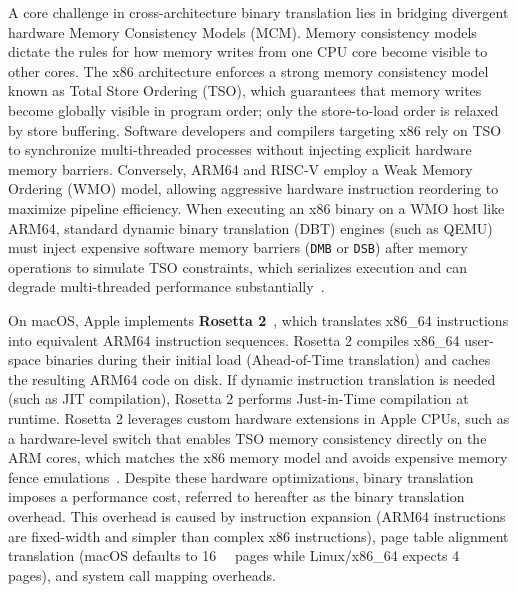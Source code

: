 A core challenge in cross-architecture binary translation lies in bridging divergent hardware Memory Consistency Models (MCM). Memory consistency models dictate the rules for how memory writes from one CPU core become visible to other cores. The x86 architecture enforces a strong memory consistency model known as Total Store Ordering (TSO), which guarantees that memory writes become globally visible in program order; only the store-to-load order is relaxed by store buffering. Software developers and compilers targeting x86 rely on TSO to synchronize multi-threaded processes without injecting explicit hardware memory barriers. Conversely, ARM64 and RISC-V employ a Weak Memory Ordering (WMO) model, allowing aggressive hardware instruction reordering to maximize pipeline efficiency. When executing an x86 binary on a WMO host like ARM64, standard dynamic binary translation (DBT) engines (such as QEMU) must inject expensive software memory barriers (\texttt{DMB} or \texttt{DSB}) after memory operations to simulate TSO constraints, which serializes execution and can degrade multi-threaded performance substantially~\cite{Gouicem2023Risotto, Gao2024CrossMapping, Reimers2026Arancini}.

On macOS, Apple implements \textbf{Rosetta 2}~\cite{apple2020rosetta}, which translates x86\_64 instructions into equivalent ARM64 instruction sequences. Rosetta 2 compiles x86\_64 user-space binaries during their initial load (Ahead-of-Time translation) and caches the resulting ARM64 code on disk. If dynamic instruction translation is needed (such as JIT compilation), Rosetta 2 performs Just-in-Time compilation at runtime. Rosetta 2 leverages custom hardware extensions in Apple CPUs, such as a hardware-level switch that enables TSO memory consistency directly on the ARM cores, which matches the x86 memory model and avoids expensive memory fence emulations~\cite{Wrenger2024AppleM1}. Despite these hardware optimizations, binary translation imposes a performance cost, referred to hereafter as the binary translation overhead. This overhead is caused by instruction expansion (ARM64 instructions are fixed-width and simpler than complex x86 instructions), page table alignment translation (macOS defaults to \SI{16}{\kilo\byte} pages while Linux/x86\_64 expects \SI{4}{\kilo\byte} pages), and system call mapping overheads.

